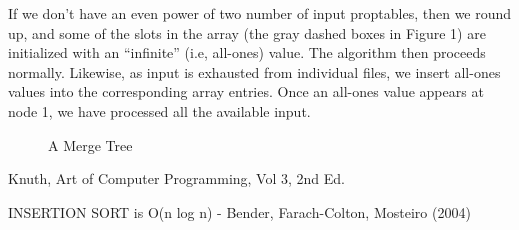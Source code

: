 \documentclass[11pt]{article}
\begin{document}
If we don't have an even power of two number of input proptables, then
we round up, and some of the slots in the array (the gray dashed boxes
in Figure 1) are initialized with an ``infinite'' (i.e, all-ones)
value.  The algorithm then proceeds normally.  Likewise, as input is
exhausted from individual files, we insert all-ones values into the
corresponding array entries.  Once an all-ones value appears at node
1, we have processed all the available input.


\begin{figure}
\begin{center}
\end{center}
\caption{A Merge Tree}
\end{figure}

\begin{thebibliography}{99}

 Knuth, Art of Computer Programming, Vol 3, 2nd Ed.

 INSERTION SORT is O(n log n) -  Bender, Farach-Colton, Mosteiro (2004)   
\hfil{}

\end{thebibliography}
\end{document}
